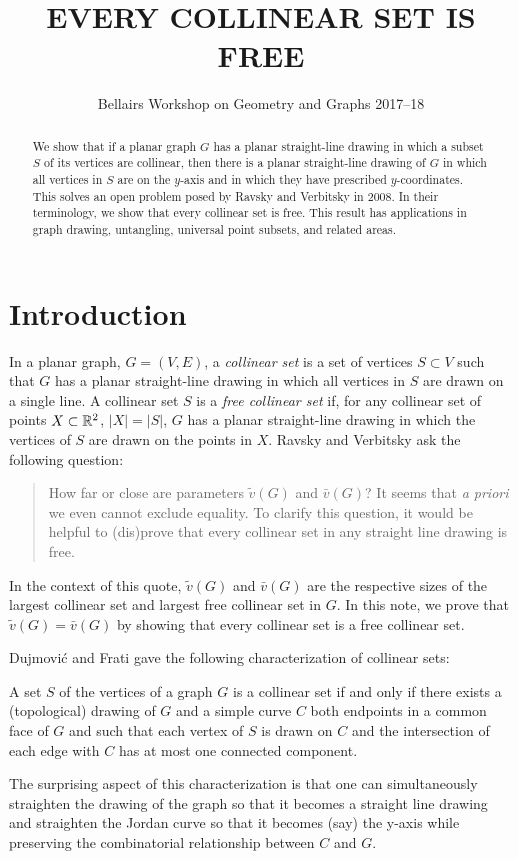\documentclass{patmorin}
\title{\MakeUppercase{Every Collinear Set is Free}}
\author{Bellairs Workshop on Geometry and Graphs 2017--18}
\begin{document}
\maketitle


\begin{abstract}
  We show that if a planar graph $G$ has a planar straight-line drawing
  in which a subset $S$ of its vertices are collinear, then there is a
  planar straight-line drawing of $G$ in which all vertices in $S$ are
  on the $y$-axis and in which they have prescribed $y$-coordinates.
  This solves an open problem posed by Ravsky and Verbitsky in 2008.
  In their terminology, we show that every collinear set is free.
  This result has applications in graph drawing, untangling, universal
  point subsets, and related areas.
\end{abstract}


\section{Introduction}

In a planar graph, $G=(V,E)$, a \emph{collinear set} is a set of vertices
$S\subset V$ such that $G$ has a planar straight-line drawing in which
all vertices in $S$ are drawn on a single line.  A collinear set $S$
is a \emph{free collinear set} if, for any collinear set of points
$X\subset\mathbb{R}^2$, $|X|=|S|$, $G$ has a planar straight-line drawing in
which the vertices of $S$ are drawn on the points in $X$.  Ravsky and
Verbitsky \cite{ravsky.verbitsky:on} ask the following question:

\begin{quote}
   How far or close are parameters $\tilde{v}(G)$ and $\bar{v}(G)$? It
   seems that \emph{a priori} we even cannot exclude equality. To clarify
   this question, it would be helpful to (dis)prove that every collinear
   set in any straight line drawing is free.
\end{quote}

In the context of this quote, $\tilde{v}(G)$ and $\bar{v}(G)$ are the
respective sizes of the largest collinear set and largest free collinear
set in $G$.  In this note, we prove that $\tilde{v}(G)=\bar{v}(G)$ by
showing that every collinear set is a free collinear set.  

Dujmovi\'c and Frati gave the following characterization of collinear sets:
\begin{thm}
   A set $S$ of the vertices of a graph $G$ is a collinear set if
   and only if there exists a (topological) drawing of $G$ and a simple
   curve $C$ both endpoints in a common face of $G$ and such that each
   vertex of $S$ is drawn on $C$ and the intersection of each edge with
   $C$ has at most one connected component.
\end{thm}
The surprising aspect of this characterization is that one can
simultaneously straighten the drawing of the graph so that it becomes a
straight line drawing and straighten the Jordan curve so that it becomes
(say) the y-axis while preserving the combinatorial relationship between
$C$ and $G$.
\end{document}
